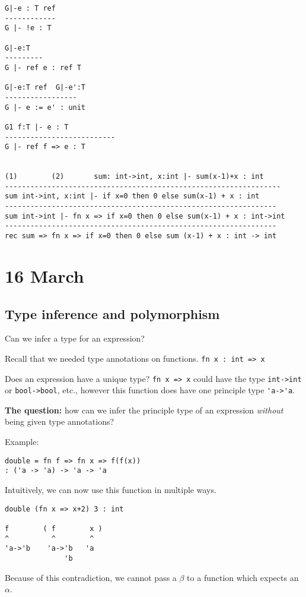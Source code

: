 \documentclass[11pt]{article}
\begin{document}
\begin{verbatim}
G|-e : T ref
------------
G |- !e : T

G|-e:T
---------
G |- ref e : ref T

G|-e:T ref  G|-e':T
-----------------
G |- e := e' : unit

G1 f:T |- e : T
--------------------------
G |- ref f => e : T


(1)        (2)       sum: int->int, x:int |- sum(x-1)+x : int
-----------------------------------------------------------------
sum int->int, x:int |- if x=0 then 0 else sum(x-1) + x : int
----------------------------------------------------------------
sum int->int |- fn x => if x=0 then 0 else sum(x-1) + x : int->int
----------------------------------------------------------------
rec sum => fn x => if x=0 then 0 else sum (x-1) + x : int -> int
\end{verbatim}


\section{16 March}
\subsection{Type inference and polymorphism}
Can we infer a type for an expression?

Recall that we needed type annotations on functions. \verb~fn x : int => x~

Does an expression have a unique type? \verb~fn x => x~ could have the type \verb~int->int~ or \verb~bool->bool~, etc., however this function does have one principle type \verb~'a->'a~.

\textbf{The question:} how can we infer the principle type of an expression \emph{without} being given type annotations?

Example:
\begin{verbatim}
double = fn f => fn x => f(f(x))
: ('a -> 'a) -> 'a -> 'a
\end{verbatim}

Intuitively, we can now use this function in multiple ways.
\begin{verbatim}
double (fn x => x+2) 3 : int

f        ( f        x )
^          ^        ^
'a->'b    'a->'b   'a
              'b
\end{verbatim}
Because of this contradiction, we cannot pass a $\beta$ to a function which expects an $\alpha$.
\end{document}
